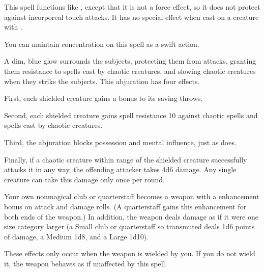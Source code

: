 \begin{spelleffect}
  This spell functions like , except that it is not a force effect, so it does not protect against incorporeal touch attacks. It has no special effect when cast on a creature with .
\end{spelleffect}
\begin{spelleffect}
  You can maintain concentration on this spell as a swift action.
\end{spelleffect}

\begin{spelleffect}
  A dim, blue glow surrounds the subjects, protecting them from attacks, granting them resistance to spells cast by chaotic creatures, and slowing chaotic creatures when they strike the subjects. This abjuration has four effects.
  \par First, each shielded creature gains a  bonus to its saving throws.
  \par Second, each shielded creature gains spell resistance 10 against chaotic spells and spells cast by chaotic creatures.
  \par Third, the abjuration blocks possession and mental influence, just as  does.
  \par Finally, if a chaotic creature within \rngmed range of the shielded creature successfully attacks it in any way, the offending attacker takes 4d6 damage. Any single creature can take this damage only once per round.
\end{spelleffect}

\spelldur{\durshort}
\begin{spelleffect}
  Your own nonmagical club or quarterstaff becomes a weapon with a  enhancement bonus on attack and damage rolls. \bonusscalingdescription (A quarterstaff gains this enhancement for both ends of the weapon.) In addition, the weapon deals damage as if it were one size category larger (a Small club or quarterstaff so transmuted deals 1d6 points of damage, a Medium 1d8, and a Large 1d10).
\end{spelleffect}
\begin{spellnotes}
  These effects only occur when the weapon is wielded by you. If you do not wield it, the weapon behaves as if unaffected by this spell.
\end{spellnotes}

